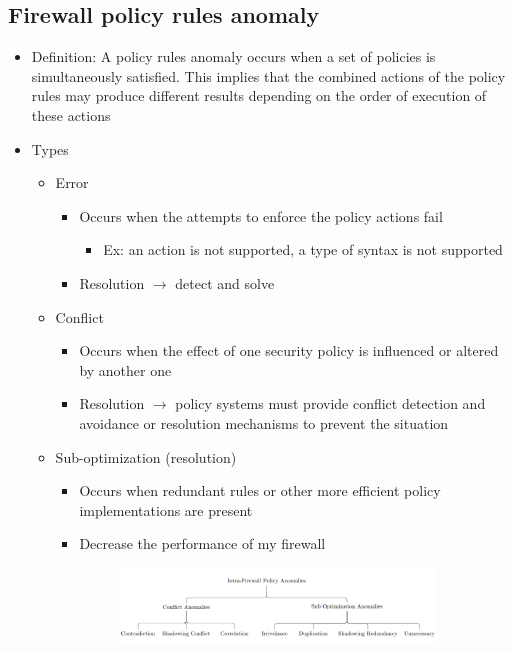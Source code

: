 \documentclass{article}
\begin{document}
\subsection{Firewall policy rules anomaly}
\begin{itemize}
  \item Definition: A policy rules anomaly occurs when a set of policies is simultaneously satisfied. This implies that the combined actions of the policy rules may produce different results depending on the order of execution of these actions
  \item Types
    \begin{itemize}
      \item Error
        \begin{itemize}
          \item Occurs when the attempts to enforce the policy actions fail
            \begin{itemize}
              \item Ex: an action is not supported, a type of syntax is not supported
            \end{itemize}
          \item Resolution $\rightarrow$ detect and solve
        \end{itemize}
      \item Conflict
        \begin{itemize}
          \item Occurs when the effect of one security policy is influenced or altered by another one
          \item Resolution $\rightarrow$ policy systems must provide conflict detection and avoidance or resolution mechanisms to prevent the situation
        \end{itemize}
      \item Sub-optimization (resolution)
        \begin{itemize}
          \item Occurs when redundant rules or other more efficient policy implementations are present
          \item Decrease the performance of my firewall
            \begin{figure}[H]
                \centering
                \includegraphics[width=0.90\textwidth]{figure/sub optimization.png}

\end{figure}
\end{itemize}
\end{itemize}
\end{itemize}
\end{document}
